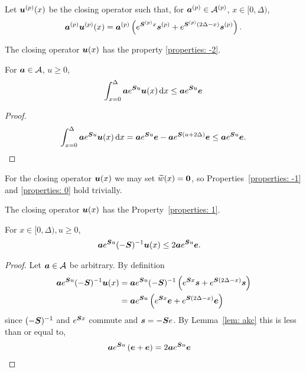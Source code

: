 Let \(\boldsymbol u^{(p)}(x)\) be the closing operator such that, for \(\boldsymbol a^{(p)} \in\mathcal A^{(p)}\), \(x\in[0,\Delta)\),
\[\boldsymbol a^{(p)} {\boldsymbol u}^{(p)}(x) = \boldsymbol a^{(p)} \left(e^{\boldsymbol{S}^{(p)}x}\boldsymbol s^{(p)} + e^{\boldsymbol{S}^{(p)}(2\Delta-x)}\boldsymbol s^{(p)}\right).\]
\begin{lem}
	The closing operator \(\boldsymbol u(x)\) has the property \ref{properties: -2}. 
	
	For \(\boldsymbol a\in\mathcal A\), \(u\geq 0\), 
	\[\int_{x=0}^\Delta \boldsymbol a e^{\boldsymbol Su}\boldsymbol u(x)\, \mathrm{d} x\leq\boldsymbol ae^{\boldsymbol Su}\boldsymbol e\]
\end{lem}
\begin{proof}
	\[\int_{x=0}^\Delta \boldsymbol a e^{\boldsymbol Su}\boldsymbol u(x)\, \mathrm{d} x=\boldsymbol ae^{\boldsymbol Su}\boldsymbol e-\boldsymbol ae^{\boldsymbol S(u+2\Delta)}\boldsymbol e\leq \boldsymbol ae^{\boldsymbol Su}\boldsymbol e.\]
\end{proof}
For the closing operator \(\boldsymbol u(x)\) we may set \(\widetilde w(x) = \boldsymbol 0\), so Properties~\ref{properties: -1} and \ref{properties: 0} hold trivially.

\begin{lem}\label{lem: akxnj}
	The closing operator \(\boldsymbol u(x)\) has the Property~\ref{properties: 1}.

	For \(x\in[0,\Delta),u\geq 0\),  
        \begin{align*}
        		\boldsymbol a   e^{\boldsymbol Su}(-\boldsymbol S)^{-1} {\boldsymbol u}(x) &\leq 2 \boldsymbol a e^{\boldsymbol Su} \boldsymbol e.
	\end{align*}
\end{lem}
\begin{proof}
Let \(\boldsymbol a   \in \mathcal A\) be arbitrary. By definition 
	\begin{align*}
        		\boldsymbol a  e^{\boldsymbol Su}(-\boldsymbol S)^{-1} {\boldsymbol u}(x) & = \boldsymbol a  e^{\boldsymbol Su}(-\boldsymbol S)^{-1}  \left(e^{\boldsymbol{S}x}\boldsymbol s + e^{\boldsymbol{S}(2\Delta-x)}\boldsymbol s\right)
				\\& = \boldsymbol a  e^{\boldsymbol Su}  \left(e^{\boldsymbol{S}x}\boldsymbol e + e^{\boldsymbol{S}(2\Delta-x)}\boldsymbol e\right)
	\end{align*}
	since \((-\boldsymbol S)^{-1}\) and \(e^{\boldsymbol Sx}\) commute and \(\boldsymbol s = -\boldsymbol S e\). 
	By Lemma~\ref{lem: akc} this is less than or equal to, 
	\begin{align}
        		& \boldsymbol a   e^{\boldsymbol Su} \left(\boldsymbol e + \boldsymbol e\right) = 2 \boldsymbol a   e^{\boldsymbol Su} \boldsymbol e \label{eqn:mzm}
	\end{align}
\end{proof}


